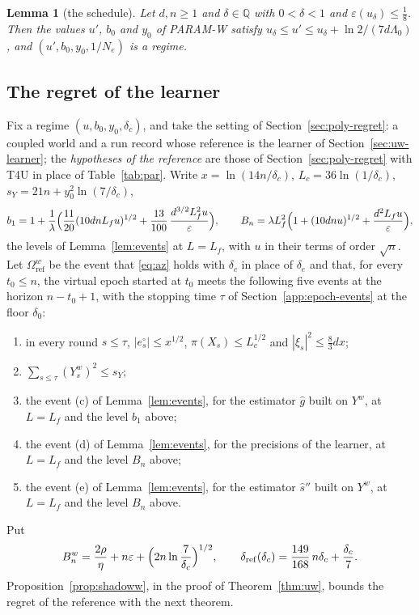 \documentclass[11pt]{amsart}
\newtheorem{lemma}[theorem]{Lemma}
\theoremstyle{definition}
\numberwithin{equation}{section}
\begin{document}
\begin{lemma}[the schedule]\label{lem:paramw}
Let $d,n\ge1$ and $\delta\in\mathbb Q$ with $0<\delta<1$ and $\varepsilon(u_\delta)\le\frac18$. Then the values $u'$, $b_0$ and $y_0$ of PARAM-W satisfy $u_\delta\le u'\le u_\delta+\ln2/(7d\Lambda_0)$, and $(u',b_0,y_0,1/N_e)$ is a regime.
\end{lemma}

\subsection{The regret of the learner}\label{sec:uw-ref}

Fix a regime $(u,b_0,y_0,\delta_c)$, and take the setting of Section~\ref{sec:poly-regret}: a coupled world and a run record whose reference is the learner of Section~\ref{sec:uw-learner}; the \emph{hypotheses of the reference} are those of Section~\ref{sec:poly-regret} with T4U in place of Table~\ref{tab:par}. Write $x=\ln(14n/\delta_c)$, $L_c=36\ln(1/\delta_c)$, $s_Y=21n+y_0^2\ln(7/\delta_c)$,
\[
b_1=1+\frac1\lambda\Bigl(\frac{11}{20}(10dnL_fu)^{1/2}+\frac{13}{100}\,\frac{d^{3/2}L_f^2u}\varepsilon\Bigr),\qquad B_n=\lambda L_f^2\Bigl(1+(10dnu)^{1/2}+\frac{d^2L_fu}\varepsilon\Bigr),
\]
the levels of Lemma~\ref{lem:events} at $L=L_f$, with $u$ in their terms of order $\sqrt n$. Let $\Omega^w_{\mathrm{ref}}$ be the event that \eqref{eq:az} holds with $\delta_c$ in place of $\delta_e$ and that, for every $t_0\le n$, the virtual epoch started at $t_0$ meets the following five events at the horizon $n-t_0+1$, with the stopping time $\tau$ of Section~\ref{app:epoch-events} at the floor $\delta_0$:
\begin{enumerate}[label=(\alph*$^w$)]
\item in every round $s\le\tau$, $|e^\circ_s|\le x^{1/2}$, $\pi(X_s)\le L_c^{1/2}$ and $|\xi_s|^2\le\frac83dx$;
\item $\sum_{s\le\tau}(Y^w_s)^2\le s_Y$;
\item the event (c) of Lemma~\ref{lem:events}, for the estimator $\hat g$ built on $Y^w$, at $L=L_f$ and the level $b_1$ above;
\item the event (d) of Lemma~\ref{lem:events}, for the precisions of the learner, at $L=L_f$ and the level $B_n$ above;
\item the event (e) of Lemma~\ref{lem:events}, for the estimator $\hat s''$ built on $Y^w$, at $L=L_f$ and the level $B_n$ above.
\end{enumerate}
Put
\[
B^w_n=\frac{2\rho}\eta+n\varepsilon+\Bigl(2n\ln\frac7{\delta_c}\Bigr)^{1/2},\qquad\delta_{\mathrm{ref}}(\delta_c)=\frac{149}{168}\,n\delta_c+\frac{\delta_c}7 .
\]
Proposition~\ref{prop:shadoww}, in the proof of Theorem~\ref{thm:uw}, bounds the regret of the reference with the next theorem.
\end{document}
